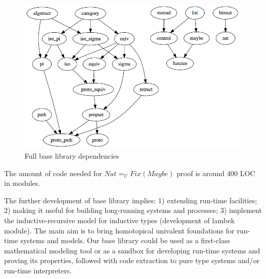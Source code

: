 \documentclass{svproc}
\begin{document}
\begin{figure}[h]
  \centerline{\includegraphics[scale=0.36]{baselib}}
  \caption{Full base library dependencies}
\end{figure}


The amount of code needed for $Nat =_U Fix(Maybe)$ proof is around 400 LOC in modules.

The further development of base library implies:
1) extending run-time facilities;
2) making it useful for building long-running systems and processes;
3) implement the inductive-recursive model for inductive types (development of lambek module).
The main aim is to bring homotopical univalent foundations for run-time systems and models.
Our base library could be used as a first-class mathematical modeling tool or as a sandbox
for developing run-time systems and proving its properties, followed with code extraction
to pure type systems and/or run-time interpreters.



\end{document}
